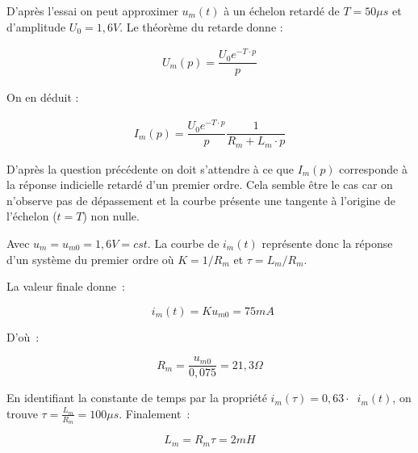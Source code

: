 \begin{texteCache}
D'après l'essai on peut approximer $u_m(t)$ à un échelon retardé de $T=50\mu s$ et d'amplitude $U_0=1,6V$.
Le théorème du retarde donne : 

\begin{align*}
U_m(p)=\dfrac{U_0e^{-T\cdot p}}{p}
\end{align*}

On en déduit : 

\begin{align*}
I_m(p)=\dfrac{U_0e^{-T\cdot p}}{p}\dfrac{1}{R_m+L_m\cdot p}
\end{align*}


\end{texteCache}


\begin{texteCache}
D'après la question précédente on doit s'attendre à ce que $I_m(p)$ corresponde à la réponse indicielle retardé d'un premier ordre. Cela semble être le cas car on n'observe pas de dépassement et la courbe présente une tangente à l'origine de l'échelon ($t=T$) non nulle.

\end{texteCache}


\begin{texteCache}
Avec \(u_{m} = u_{m0} = 1,6V = cst\). La courbe de \(i_{m}(t)\)
représente donc la réponse d'un système du premier ordre où
\(K = 1/R_{m}\) et \(\tau = L_{m}/R_{m}\).

La valeur finale donne~:

\[\operatorname{}{i_{m}(t)} = Ku_{m0} = 75mA\]

D'où~:

\[R_{m} = \frac{u_{m0}}{0,075} = 21,3\Omega\]

En identifiant la constante de temps par la propriété
\(i_{m}\left( \tau \right) = 0,63 \cdot \operatorname{}{i_{m}(t)}\), on
trouve \(\tau = \frac{L_{m}}{R_{m}} = 100\mu s\). Finalement~:

\[L_{m} = R_{m}\tau = 2mH\]

\end{texteCache}


